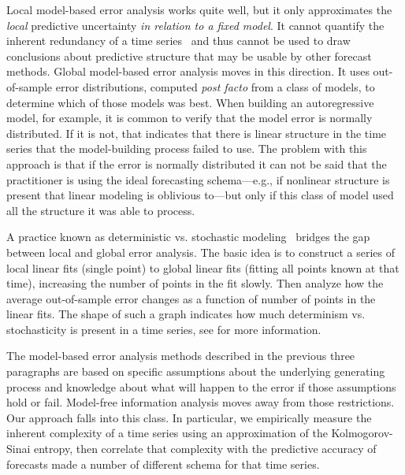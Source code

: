 Local model-based error analysis works quite well, but it only
approximates the \emph{local} predictive uncertainty \emph{in relation
  to a fixed model}.  It cannot quantify the inherent redundancy of a
time series~\cite{crutchfield2003} and thus cannot be used to draw
conclusions about predictive structure that may be usable by other
forecast methods.
%
%
Global model-based error analysis moves in this direction.  It uses
out-of-sample error distributions, computed {\sl post facto} from a
class of models, to determine which of those models was best.  When
building an autoregressive model, for example, it is common to verify
that the model error is normally distributed.  If it is not, that
indicates that there is linear structure in the time series that the
model-building process failed to use.  The problem with this approach
is that if the error is normally distributed it can not be said that
the practitioner is using the ideal forecasting schema---e.g., if
nonlinear structure is present that linear modeling is oblivious
to---but only if this class of model used all the structure it was
able to process.

A practice known as deterministic vs. stochastic
modeling~\cite{Casdagli92dvsplots, weigend-book} bridges the gap
between local and global error analysis. The basic idea is to
construct a series of local linear fits (single point) to global
linear fits (fitting all points known at that time), increasing the
number of points in the fit slowly. Then analyze how the average
out-of-sample error changes as a function of number of points in the
linear fits. The shape of such a graph indicates how much determinism
vs. stochasticity is present in a time series, see
\cite{Casdagli92dvsplots, weigend-book} for more information.

The model-based error analysis methods described in the previous three
paragraphs are based on specific assumptions about the underlying
generating process and knowledge about what will happen to the error
if those assumptions hold or fail.  Model-free information analysis
moves away from those restrictions.  Our approach falls into this
class.  In particular, we empirically measure the inherent complexity
of a time series using an approximation of the Kolmogorov-Sinai
entropy, then correlate that complexity with the predictive accuracy
of forecasts made a number of different schema for that time series.

